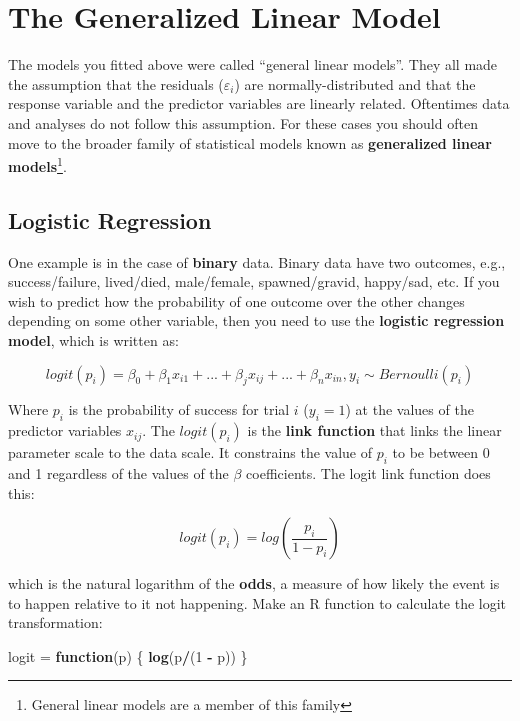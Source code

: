 \documentclass[]{book}
\newenvironment{Shaded}{\begin{snugshade}}{\end{snugshade}}
\newcommand{\KeywordTok}[1]{\textcolor[rgb]{0.13,0.29,0.53}{\textbf{#1}}}
\newcommand{\DecValTok}[1]{\textcolor[rgb]{0.00,0.00,0.81}{#1}}
\newcommand{\StringTok}[1]{\textcolor[rgb]{0.31,0.60,0.02}{#1}}
\newcommand{\ControlFlowTok}[1]{\textcolor[rgb]{0.13,0.29,0.53}{\textbf{#1}}}
\newcommand{\OperatorTok}[1]{\textcolor[rgb]{0.81,0.36,0.00}{\textbf{#1}}}
\newcommand{\NormalTok}[1]{#1}
\let\rmarkdownfootnote\footnote%
\def\footnote{\protect\rmarkdownfootnote}
\theoremstyle{definition}
\theoremstyle{definition}
\theoremstyle{definition}
\theoremstyle{remark}
\begin{document}
\section{The Generalized Linear Model}\label{glms}

The models you fitted above were called ``general linear models''. They
all made the assumption that the residuals (\(\varepsilon_i\)) are
normally-distributed and that the response variable and the predictor
variables are linearly related. Oftentimes data and analyses do not
follow this assumption. For these cases you should often move to the
broader family of statistical models known as \textbf{generalized linear
models}\footnote{General linear models are a member of this family}.

\subsection{Logistic Regression}\label{logis-regression}

One example is in the case of \textbf{binary} data. Binary data have two
outcomes, e.g., success/failure, lived/died, male/female,
spawned/gravid, happy/sad, etc. If you wish to predict how the
probability of one outcome over the other changes depending on some
other variable, then you need to use the \textbf{logistic regression
model}, which is written as:

\begin{equation}
  logit(p_i)=\beta_0 + \beta_1 x_{i1} + ... + \beta_j x_{ij}+ ... + \beta_n x_{in}, y_i \sim Bernoulli(p_i)
\label{eq:logis-reg}
\end{equation}

Where \(p_i\) is the probability of success for trial \(i\)
(\(y_i = 1\)) at the values of the predictor variables \(x_{ij}\). The
\(logit(p_i)\) is the \textbf{link function} that links the linear
parameter scale to the data scale. It constrains the value of \(p_i\) to
be between 0 and 1 regardless of the values of the \(\beta\)
coefficients. The logit link function does this:

\begin{equation}
  logit(p_i) = log\left(\frac{p_i}{1-p_i}\right)
\label{eq:logit}
\end{equation}

which is the natural logarithm of the \textbf{odds}, a measure of how
likely the event is to happen relative to it not happening. Make an R
function to calculate the logit transformation:

\begin{Shaded}
\begin{Highlighting}[]
\NormalTok{logit =}\StringTok{ }\ControlFlowTok{function}\NormalTok{(p) \{}
  \KeywordTok{log}\NormalTok{(p}\OperatorTok{/}\NormalTok{(}\DecValTok{1} \OperatorTok{-}\StringTok{ }\NormalTok{p))}
\NormalTok{\}}
\end{Highlighting}
\end{Shaded}
\end{document}
